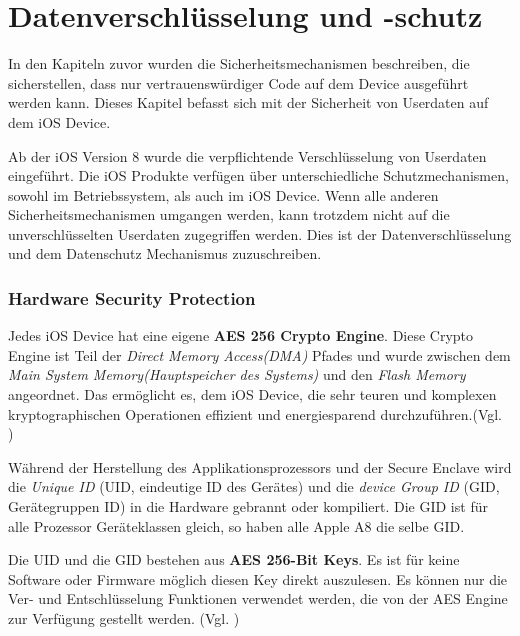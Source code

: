 \section{Datenverschlüsselung und -schutz}
\label{sec:EncryptionandDataProtection}

In den Kapiteln zuvor wurden die Sicherheitsmechanismen beschreiben, die sicherstellen, dass nur vertrauenswürdiger Code auf dem Device ausgeführt werden kann. Dieses Kapitel befasst sich mit der Sicherheit von Userdaten auf dem iOS Device. 

Ab der iOS Version 8 wurde die verpflichtende Verschlüsselung von Userdaten eingeführt. Die iOS Produkte verfügen über unterschiedliche Schutzmechanismen, sowohl im Betriebssystem, als auch im iOS Device. Wenn alle anderen Sicherheitsmechanismen umgangen werden, kann trotzdem nicht auf die unverschlüsselten Userdaten zugegriffen werden. Dies ist der Datenverschlüsselung und dem Datenschutz Mechanismus zuzuschreiben.

\subsubsection{Hardware Security Protection}
\label{sec:HardwareSecProtection}

Jedes iOS Device hat eine eigene \textbf{AES 256 Crypto Engine}. Diese Crypto Engine ist Teil der \textit{\glqq Direct Memory Access(DMA)\grqq{}} Pfades und wurde zwischen dem \textit{\glqq Main System Memory(Hauptspeicher des Systems)\grqq{}} und den \textit{\glqq Flash Memory\grqq{}} angeordnet. Das ermöglicht es, dem iOS Device, die sehr teuren und komplexen kryptographischen Operationen effizient und energiesparend durchzuführen.(Vgl. \cite{iOSSec[5], iOSSec[2],iOSSec[1], Apple[4], Apple[5], Apple[6], Apple[3]})

Während der Herstellung des Applikationsprozessors und der Secure Enclave wird die \textit{\glqq Unique ID\grqq{}} (UID, eindeutige ID des Gerätes) und die \textit{\glqq device Group ID\grqq{}} (GID, Gerätegruppen ID) in die Hardware gebrannt oder kompiliert. Die GID ist für alle Prozessor Geräteklassen gleich, so haben alle Apple A8 die selbe GID. \par 
Die UID und die GID bestehen aus \textbf{AES 256-Bit Keys}. Es ist für keine Software oder Firmware möglich diesen Key direkt auszulesen. Es können nur die Ver- und Entschlüsselung Funktionen verwendet werden, die von der AES Engine zur Verfügung gestellt werden. (Vgl. \cite{iOSSec[5], iOSSec[2],iOSSec[1], Apple[4], Apple[5], Apple[6], Apple[3]})

